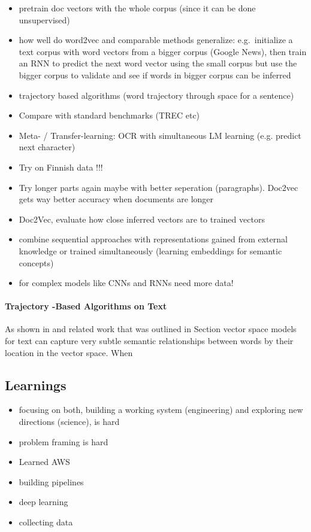 \begin{itemize}
	\item pretrain doc vectors with the whole corpus (since it can be done unsupervised)
  \item how well do word2vec and comparable methods generalize: e.g.\ initialize a text corpus with word vectors from a bigger corpus (Google News), then train an RNN to predict the next word vector using the small corpus but use the bigger corpus to validate and see if words in bigger corpus can be inferred
  \item trajectory based algorithms (word trajectory through space for a sentence)
  \item Compare with standard benchmarks (TREC etc)
  \item Meta- / Transfer-learning: OCR with simultaneous LM learning (e.g. predict next character)
  \item Try on Finnish data !!!
  \item Try longer parts again maybe with better seperation (paragraphs). Doc2vec gets way better accuracy when documents are longer
  \item Doc2Vec, evaluate how close inferred vectors are to trained vectors
  \item combine sequential approaches with representations gained from external knowledge or trained simultaneously (learning embeddings for semantic concepts)
  \item for complex models like CNNs and RNNs need more data!
  \
\end{itemize}


\paragraph{Trajectory -Based Algorithms on Text}
\label{par:Trajectory Algorithms on Text}
As shown in \cite{Mikolov:2013ac} and related work that was outlined in Section vector space models for text can capture very subtle semantic relationships between words by their location in the vector space. When


\subsection*{Learnings}
\label{sub:learnings}

\begin{itemize}
  \item focusing on both, building a working system (engineering) and exploring new directions (science), is hard
  \item problem framing is hard
  \item Learned AWS
  \item building pipelines
  \item deep learning
  \item collecting data
\end{itemize}
